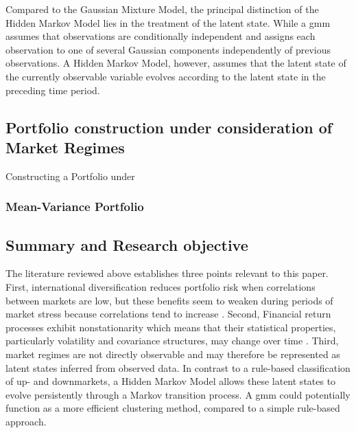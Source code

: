 Compared to the Gaussian Mixture Model, the principal distinction of the Hidden Markov Model lies in the treatment of the latent state. While a \gls{gmm} assumes that observations are conditionally independent and assigns each observation to one of several Gaussian components independently of previous observations.
A Hidden Markov Model, however, assumes that the latent state of the currently observable variable evolves according to the latent state in the preceding time period.

\subsection{Portfolio construction under consideration of Market Regimes}
Constructing a Portfolio under 

\subsubsection{Mean-Variance Portfolio}

\subsection{Summary and Research objective}
The literature reviewed above establishes three points relevant to this paper. First, international diversification reduces portfolio risk when correlations between markets are low, but these benefits seem to weaken during periods of market stress because correlations tend to increase \citep{solnik1974,ang2002}.
Second, Financial return processes exhibit nonstationarity which means that their statistical properties, particularly volatility and covariance structures, may change over time \citep{starica2005}. Third, market regimes are not directly observable and may therefore be represented as latent states inferred from observed data. 
In contrast to a rule-based classification of up- and downmarkets, a Hidden Markov Model allows these latent states to evolve persistently through a Markov transition process. A \gls{gmm} could potentially function as a more efficient clustering method, compared to a simple rule-based approach. 

